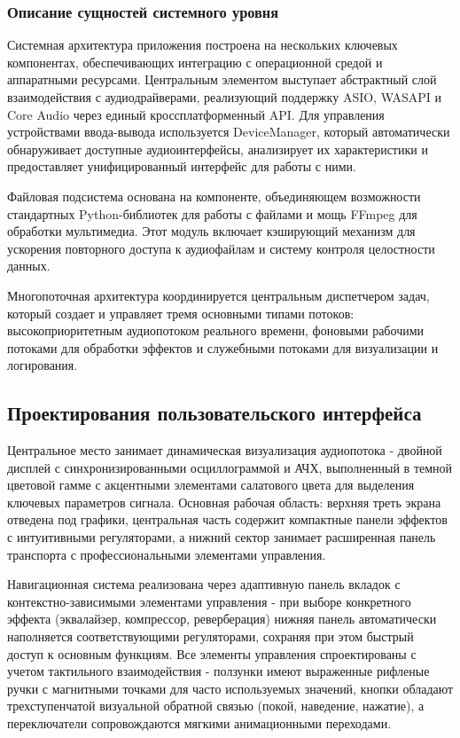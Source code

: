 \subsubsection{Описание сущностей системного уровня}

Системная архитектура приложения построена на нескольких ключевых компонентах, обеспечивающих интеграцию с операционной средой и аппаратными ресурсами. Центральным элементом выступает абстрактный слой взаимодействия с аудиодрайверами, реализующий поддержку ASIO, WASAPI и Core Audio через единый кроссплатформенный API. Для управления устройствами ввода-вывода используется DeviceManager, который автоматически обнаруживает доступные аудиоинтерфейсы, анализирует их характеристики и предоставляет унифицированный интерфейс для работы с ними.

Файловая подсистема основана на компоненте, объединяющем возможности стандартных Python-библиотек для работы с файлами и мощь FFmpeg для обработки мультимедиа. Этот модуль включает кэширующий механизм для ускорения повторного доступа к аудиофайлам и систему контроля целостности данных. 

Многопоточная архитектура координируется центральным диспетчером задач, который создает и управляет тремя основными типами потоков: высокоприоритетным аудиопотоком реального времени, фоновыми рабочими потоками для обработки эффектов и служебными потоками для визуализации и логирования.

\subsection{Проектирования пользовательского интерфейса}

Центральное место занимает динамическая визуализация аудиопотока - двойной дисплей с синхронизированными осциллограммой и АЧХ, выполненный в темной цветовой гамме с акцентными элементами салатового цвета для выделения ключевых параметров сигнала. Основная рабочая область: верхняя треть экрана отведена под графики, центральная часть содержит компактные панели эффектов с интуитивными регуляторами, а нижний сектор занимает расширенная панель транспорта с профессиональными элементами управления.

Навигационная система реализована через адаптивную панель вкладок с контекстно-зависимыми элементами управления - при выборе конкретного эффекта (эквалайзер, компрессор, реверберация) нижняя панель автоматически наполняется соответствующими регуляторами, сохраняя при этом быстрый доступ к основным функциям. Все элементы управления спроектированы с учетом тактильного взаимодействия - ползунки имеют выраженные рифленые ручки с магнитными точками для часто используемых значений, кнопки обладают трехступенчатой визуальной обратной связью (покой, наведение, нажатие), а переключатели сопровождаются мягкими анимационными переходами.

